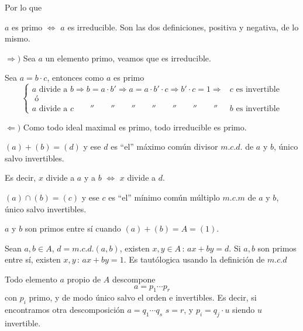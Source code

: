 Por lo que 
\begin{prop}
    $a$ es primo $\iff$ $a$ es irreducible. Son las dos definiciones, positiva y negativa, de lo mismo.
\end{prop}
\begin{dem}
    $\Rightarrow)$ Sea $a$ un elemento primo, veamos que es irreducible.

    Sea $a=b\cdot c$, entonces como $a$ es primo
    $$\begin{cases}
        a \text{ divide a } b  \Rightarrow b=a\cdot b' \Rightarrow a=a\cdot b' \cdot c \Rightarrow b'\cdot c =1 \Rightarrow & c \text{ es invertible} \\ \text{ \'o} \\
        a \text{ divide a } c  \qquad '' \qquad '' \qquad '' \qquad ''\qquad '' \qquad '' \qquad '' & b \text{ es invertible} 
    \end{cases}$$
    

    $\Leftarrow)$ Como todo ideal maximal es primo, todo irreducible es primo. 
\end{dem}
\begin{defi}
    $(a)+(b) = (d)$ y ese $d$ es ``el'' m\'aximo com\'un divisor $m.c.d.$ de $a$ y $b$, \'unico salvo invertibles. 

    Es decir, $x$ divide a $a$ y a $b$ $\iff$ $x$ divide a $d$. 

    $(a) \cap (b) = (c)$ y ese $c$ es ``el'' m\'inimo com\'un m\'ultiplo $m.c.m$ de $a$ y $b$, \'unico salvo invertibles.

    $a$ y $b$ son primos entre s\'i cuando $(a) + (b) = A=(1)$.
\end{defi}
\begin{defi}
     Sean $a,b \in A$, $d=m.c.d.(a,b)$, existen $x, y \in A \, : \, ax+by = d$. Si $a,b$ son primos entre s\'i, existen $x,y \, : \, ax+by = 1$. Es taut\'ologica usando la definici\'on de $m.c.d$
\end{defi}
\begin{teo}
    Todo elemento $a$ propio de $A$ descompone
    $$a=p_1\cdots p_r$$ con $p_i$ primo, y de modo \'unico salvo el orden e invertibles. Es decir, si encontramos otra descomposici\'on $a=q_1\cdots q_s$ $s=r$, y $p_i = q_j \cdot u$ siendo $u$ invertible.  
\end{teo} 
